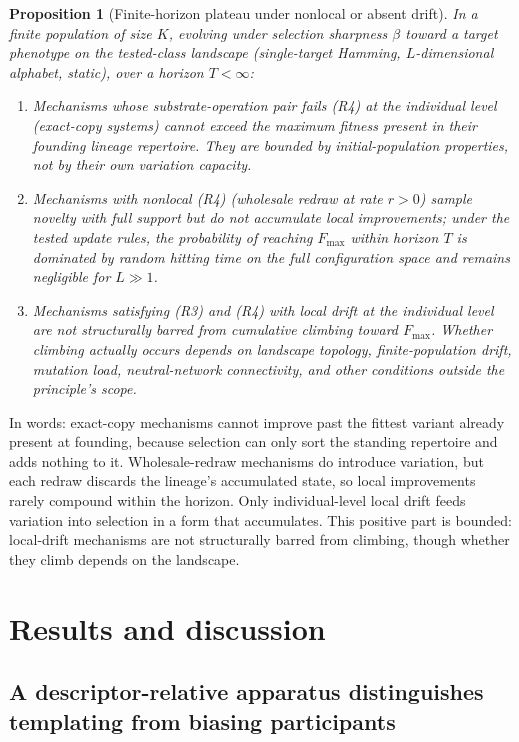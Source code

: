 \documentclass[aps,prx,reprint,amsmath,amssymb,floatfix,superscriptaddress,nofootinbib]{revtex4-2}
\theoremstyle{plain-thm}
\newtheorem{proposition}{Proposition}
\theoremstyle{definition-thm}
\begin{document}
\begin{proposition}[Finite-horizon plateau under nonlocal or absent drift]
\label{prop:plateau}
In a finite population of size $K$, evolving under selection sharpness $\beta$ toward a target phenotype on the tested-class landscape (single-target Hamming, $L$-dimensional alphabet, static), over a horizon $T < \infty$:
\begin{enumerate}
\item Mechanisms whose substrate-operation pair fails (R4) at the individual level (exact-copy systems) cannot exceed the maximum fitness present in their founding lineage repertoire. They are bounded by initial-population properties, not by their own variation capacity.
\item Mechanisms with nonlocal (R4) (wholesale redraw at rate $r > 0$) sample novelty with full support but do not accumulate local improvements; under the tested update rules, the probability of reaching $F_{\max}$ within horizon $T$ is dominated by random hitting time on the full configuration space and remains negligible for $L \gg 1$.
\item Mechanisms satisfying (R3) and (R4) with local drift at the individual level are not structurally barred from cumulative climbing toward $F_{\max}$. Whether climbing actually occurs depends on landscape topology, finite-population drift, mutation load, neutral-network connectivity, and other conditions outside the principle's scope.
\end{enumerate}
\end{proposition}

In words: exact-copy mechanisms cannot improve past the fittest variant already present at founding, because selection can only sort the standing repertoire and adds nothing to it. Wholesale-redraw mechanisms do introduce variation, but each redraw discards the lineage's accumulated state, so local improvements rarely compound within the horizon. Only individual-level local drift feeds variation into selection in a form that accumulates. This positive part is bounded: local-drift mechanisms are not structurally barred from climbing, though whether they climb depends on the landscape.


\section{Results and discussion}
\label{sec:results}

\subsection{A descriptor-relative apparatus distinguishes templating from biasing participants}
\end{document}
